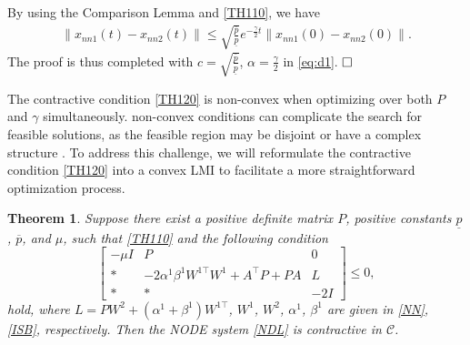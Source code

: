 \documentclass[journal,twoside,web]{ieeecolor}
\renewenvironment{proof}{\vspace{.1cm}\noindent{\sc Proof.}\hspace{0.10cm}\,\,}{$\hfill\Box$\vspace{.1cm}}
\newtheorem{theorem}            {Theorem}[section]
\begin{document}
\begin{proof}
\begin{equation}
\begin{aligned}
\end{aligned}
\end{equation}
By using the Comparison Lemma and \eqref{TH110}, we have 
\begin{equation}\label{TH1P3}
\begin{aligned}
\|x_{nn1}(t)-x_{nn2}(t)\|\leq \sqrt{\frac{\overline{p} }{\underline{p} } } e^{-\frac{\gamma}{2} t} \|x_{nn1}(0)-x_{nn2}(0)\|.
\end{aligned}
\end{equation}
The proof is thus completed with $c=\sqrt{\frac{\overline{p} }{\underline{p} } }$, $\alpha=\frac{\gamma}{2}$ in \eqref{eq:d1}.
\end{proof}

The contractive condition \eqref{TH120} is non-convex when optimizing over both $P$ and $\gamma$ simultaneously. non-convex conditions can complicate the search for feasible solutions, as the feasible region may be disjoint or have a complex structure \cite{boyd2004convex}. To address this challenge, we will reformulate the contractive condition \eqref{TH120} into a convex LMI to facilitate a more straightforward optimization process.




\begin{theorem}\label{the11} Suppose there exist a positive definite matrix $P$, positive constants $\underline{p}$, $\overline{p}$, and $\mu$, such that  \eqref{TH110} and the following condition
\begin{equation}\label{CO12}
\begin{bmatrix}
-\mu I&P &0\\\ast&-2\alpha^1\beta^1W^{1\top}W^1+A^\top P+PA&L\\
\ast&\ast& -2I
\end{bmatrix}\leq 0,
\end{equation} 
hold, where $L=PW^2+(\alpha^1+\beta^1)W^{1\top}$, $W^1$, $W^2$, $\alpha^1$, $\beta^1$ are given in \eqref{NN}, \eqref{ISB}, respectively. Then the NODE system \eqref{NDL} is contractive in $\mathcal{C}$.
\end{theorem}
\end{document}
